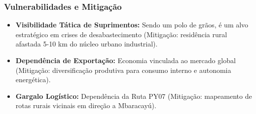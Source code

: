 \subsubsection{Vulnerabilidades e
Mitigação}

\begin{itemize}
\tightlist
\item
  \textbf{Visibilidade Tática de Suprimentos:} Sendo um polo de grãos, é
  um alvo estratégico em crises de desabastecimento (Mitigação:
  residência rural afastada 5-10 km do núcleo urbano industrial).
\item
  \textbf{Dependência de Exportação:} Economia vinculada ao mercado
  global (Mitigação: diversificação produtiva para consumo interno e
  autonomia energética).
\item
  \textbf{Gargalo Logístico:} Dependência da Ruta PY07 (Mitigação:
  mapeamento de rotas rurais vicinais em direção a Mbaracayú).
\end{itemize}

